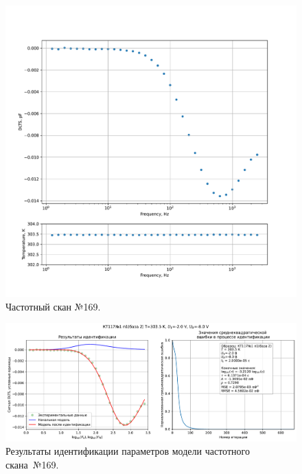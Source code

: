 \begin{figure}[!ht]
    \centering
    \includegraphics[width=1\textwidth]{../plots/КТ117№1_п1(база 2)_2500Гц-1Гц_1пФ_+30С_-2В-8В_200мВ_20мкс_шаг_0,1.pdf}
    \caption{Частотный скан №169.}
    \label{pic:frequency_scan_169}
\end{figure}

\begin{figure}[!ht]
    \centering
    \includegraphics[width=1\textwidth]{../plots/КТ117№1_п1(база 2)_2500Гц-1Гц_1пФ_+30С_-2В-8В_200мВ_20мкс_шаг_0,1_model.pdf}
    \caption{Результаты идентификации параметров модели частотного скана~№169.}
    \label{pic:frequency_scan_model169}
\end{figure}

\pagebreak


